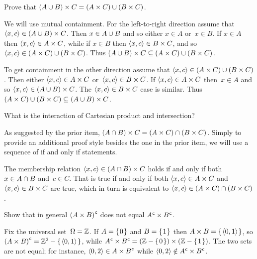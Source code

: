 \documentclass{ibl}  %
\begin{document}
\begin{problem}[\maxlength] 
\begin{exes}
\begin{exercise}
  Prove that $(A\cup B)\times C=(A\times C)\cup(B\times C)$.
\end{exercise}
\begin{answer}
  We will use mutual containment.
  For the left-to-right direction
  assume that $\langle x,c\rangle\in (A\cup B)\times C$.
  Then $x\in A\cup B$ and so either $x\in A$ or~$x\in B$.
  If $x\in A$ then $\langle x,c\rangle\in A\times C$, while 
  if $x\in B$ then $\langle x,c\rangle\in B\times C$, and so 
  $\langle x,c\rangle\in (A\times C)\cup (B\times C)$.
  Thus $(A\cup B)\times C\subseteq (A\times C)\cup (B\times C)$.
  
  To get containment in the other direction assume that 
  $\langle x,c\rangle\in (A\times C)\cup (B\times C)$.
  Then either $\langle x,c\rangle\in A\times C$ or~$\langle x,c\rangle\in B\times C$.
  If $\langle x,c\rangle\in A\times C$ then~$x\in A$ and so 
  $\langle x,c\rangle\in (A\cup B)\times C$.
  The  $\langle x,c\rangle\in B\times C$ case is similar.
  Thus $(A\times C)\cup (B\times C)\subseteq (A\cup B)\times C$.   
\end{answer}
\begin{exercise}
  What is the interaction of Cartesian product and intersection?
\end{exercise}
\begin{answer}
  As suggested by the prior item,
  $(A\cap B)\times C = (A\times C)\cap (B\times C)$.
  Simply to provide an additional proof style besides the one in the prior item,
  we will use a sequence of if and only if statements.

  The membership relation $\langle x,c\rangle\in (A\cap B)\times C$
  holds if and only if both
  $x\in A\cap B$ and~$c\in C$.
  That is true if and only if both
  $\langle x,c\rangle\in A\times C$ and~$\langle x,c\rangle\in B\times C$ are true,
  which in turn is equivalent to
  $\langle x,c\rangle\in (A\times C)\cap (B\times C)$.  
\end{answer}
\begin{exercise} 
  Show that in general ${(A\times B)}^{\mspace{1mu}\mathsf{c}}$ does not equal 
  ${A}^{\mspace{1mu}\mathsf{c}}\times{B}^{\mspace{1mu}\mathsf{c}}$.
\end{exercise}
\begin{answer}
  Fix the universal set~$\Omega=\mathbb{Z}$.
  If
  $A=\mbox{$\{\hspace{0.1em}0\hspace{0.1em}\}$}$ and $B=\mbox{$\{\hspace{0.1em}1\hspace{0.1em}\}$}$ then $A\times B=\mbox{$\{\hspace{0.1em}\langle0,1\rangle\hspace{0.1em}\}$}$,
  so ${(A\times B)}^{\mspace{1mu}\mathsf{c}}=\mathbb{Z}^2-\mbox{$\{\hspace{0.1em}\langle0,1\rangle\hspace{0.1em}\}$}$,
  while ${A}^{\mspace{1mu}\mathsf{c}}\times{B}^{\mspace{1mu}\mathsf{c}}=(\mathbb{Z}-\mbox{$\{\hspace{0.1em}0\hspace{0.1em}\}$})\times(\mathbb{Z}-\mbox{$\{\hspace{0.1em}1\hspace{0.1em}\}$})$.
  The two sets are not equal; 
  for instance, $\langle0,2\rangle\in {A\times B}^{\mspace{1mu}\mathsf{c}}$
  while $\langle0,2\rangle\notin{A}^{\mspace{1mu}\mathsf{c}}\times{B}^{\mspace{1mu}\mathsf{c}}$.  
\end{answer}
\end{exes}
\end{problem}
\end{document}
